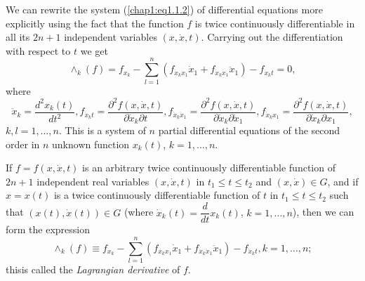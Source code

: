 We can rewrite the system (\ref{chap1:eq1.1.2}) of differential equations more explicitly using the fact that the function $f$ is twice continuously differentiable in all its $2n+1$ independent variables $(x, \dot{x},t)$. Carrying out the differentiation with respect to $t$ we get
$$
\wedge_k (f) = f_{x_k} - \sum\limits^n_{l=1} (f_{\dot{x}_k x_1} \dot{x}_1 + f_{\dot{x}_k \dot{x}_1} \ddot{x}_1) - f_{\dot{x}_kt} = 0,
$$
where
$$
\ddot{x}_k = \frac{d^2 x_k(t)}{dt^2} , f_{\dot{x}_kt} = \frac{\partial^2 f(x, \dot{x},t)}{\partial \dot{x}_k \partial t}, f_{\dot{x}_k \dot{x}_1} = \frac{\partial^2 f(x,\dot{x},t)}{\partial \dot{x}_k \partial \dot{x}_1} , f_{\dot{x}_k x_1} = \frac{\partial^2 f(x, \dot{x},t)}{\partial \dot{x}_k \partial x_1}, 
$$
$k, l = 1, \ldots, n$. This is a system of $n$ partial differential equations of the second order in $n$ unknown function $x_k(t)$, $k=1, \ldots, n$.

If $f = f(x, \dot{x},t)$ is an arbitrary twice continuously differentiable function of $2n+1$ independent real variables $(x, \dot{x},t)$ in $t_1 \leq t \leq t_2$ and $(x, \dot{x}) \in G$, and if $x = x(t)$ is a twice continuously differentiable function of $t$ in $t_1 \leq t\leq t_2$ such that $(x(t), \dot{x}(t)) \in G$ (where $\dot{x}_k(t) = \dfrac{d}{dt} x_k(t)$, $k=1, \ldots, n$), then we can form the expression 
$$
\wedge_k(f) \equiv f_{x_k} - \sum\limits^n_{l=1} (f_{\dot{x_k} x_1} \dot{x}_1+ f_{\dot{x}_k  \dot{x}_1} \ddot{x}_1) - f_{\dot{x}_k t}, k = 1, \ldots, n;
$$
this\pageoriginale is called the {\em Lagrangian derivative} of $f$.

